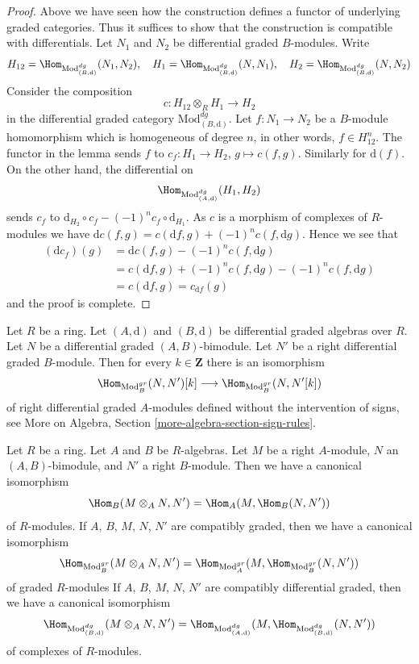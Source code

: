 \begin{proof}
Above we have seen how the construction defines a functor of underlying
graded categories. Thus it suffices to show that the construction is
compatible with differentials. Let $N_1$ and $N_2$ be differential
graded $B$-modules. Write
$$
H_{12} = \Hom_{\text{Mod}^{dg}_{(B, \text{d})}}(N_1, N_2),\quad
H_1 = \Hom_{\text{Mod}^{dg}_{(B, \text{d})}}(N, N_1),\quad
H_2 = \Hom_{\text{Mod}^{dg}_{(B, \text{d})}}(N, N_2)
$$
Consider the composition
$$
c : H_{12} \otimes_R H_1 \longrightarrow H_2
$$
in the differential graded category $\text{Mod}^{dg}_{(B, \text{d})}$.
Let $f : N_1 \to N_2$ be a $B$-module homomorphism which is homogeneous
of degree $n$, in other words, $f \in H_{12}^n$.
The functor in the lemma sends $f$ to $c_f : H_1 \to H_2$, $g \mapsto c(f, g)$.
Similarly for $\text{d}(f)$. On the other hand, the differential on
$$
\Hom_{\text{Mod}^{dg}_{(A, \text{d})}}(H_1, H_2)
$$
sends $c_f$ to $\text{d}_{H_2} \circ c_f - (-1)^n c_f \circ \text{d}_{H_1}$.
As $c$ is a morphism of complexes of $R$-modules we have
$\text{d} c(f, g) = c(\text{d}f, g) + (-1)^n c(f, \text{d}g)$.
Hence we see that
\begin{align*}
(\text{d}c_f)(g)
& =
\text{d}c(f,g) - (-1)^n c(f, \text{d}g) \\
& =
c(\text{d}f, g) + (-1)^n c(f, \text{d}g)  - (-1)^n c(f, \text{d}g) \\
& =
c(\text{d}f, g) = c_{\text{d}f}(g)
\end{align*}
and the proof is complete.
\end{proof}

\begin{remark}
\label{remark-shift-hom-no-sign}
Let $R$ be a ring. Let $(A, \text{d})$ and $(B, \text{d})$
be differential graded algebras over $R$. Let $N$ be a
differential graded $(A, B)$-bimodule. Let $N'$ be a right differential
graded $B$-module. Then for every $k \in \mathbf{Z}$ there
is an isomorphism
$$
\Hom_{\text{Mod}^{gr}_B}(N, N')[k]
\longrightarrow
\Hom_{\text{Mod}^{gr}_B}(N, N'[k])
$$
of right differential graded $A$-modules defined without the intervention
of signs, see More on Algebra, Section \ref{more-algebra-section-sign-rules}.
\end{remark}

\begin{lemma}
\label{lemma-tensor-hom-adjunction}
Let $R$ be a ring. Let $A$ and $B$ be $R$-algebras.
Let $M$ be a right $A$-module, $N$ an $(A, B)$-bimodule, and
$N'$ a right $B$-module. Then we have a canonical isomorphism
$$
\Hom_B(M \otimes_A N, N') = \Hom_A(M, \Hom_B(N, N'))
$$
of $R$-modules.
If $A$, $B$, $M$, $N$, $N'$ are compatibly graded, then we have a
canonical isomorphism
$$
\Hom_{\text{Mod}_B^{gr}}(M \otimes_A N, N') =
\Hom_{\text{Mod}_A^{gr}}(M, \Hom_{\text{Mod}_B^{gr}}(N, N'))
$$
of graded $R$-modules
If $A$, $B$, $M$, $N$, $N'$ are compatibly differential graded, then
we have a canonical isomorphism
$$
\Hom_{\text{Mod}^{dg}_{(B, \text{d})}}(M \otimes_A N, N') =
\Hom_{\text{Mod}^{dg}_{(A, \text{d})}}(M,
\Hom_{\text{Mod}^{dg}_{(B, \text{d})}}(N, N'))
$$
of complexes of $R$-modules.
\end{lemma}

